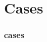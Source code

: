 \section{Cases}
\begin{comment}
* Cases
** Case study: Scientific Computing (we know this target exists)
*** Target user: a senior physics major who knows some C, and wants to either 1) contribute to a project or 2) do some research and feed it back into a community
*** Write wiki articles instead of writing a paper.
*** http://www.scipy.org/Getting_Started
*** http://www.opensourcephysics.org/
**** Extend with projects that run on the EC2 compute cloud / GPGPUs
*** Automation of experiments / Arduino
\end{comment}

\begin{frame} 
\frametitle{cases}
\end{frame} 
